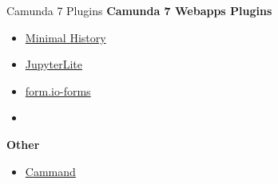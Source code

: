 \documentclass[12pt,aspectratio=169]{beamer}
\begin{document}
\begin{frame}{Camunda 7 Plugins}
\textbf{Camunda 7 Webapps Plugins}
\par
\vspace{0.5cm}
\par
\begin{minipage}{0.5\textwidth}
\begin{itemize}
    \item \href{https://github.com/datakurre/camunda-cockpit-plugins}{Minimal History}
    \item \href{https://github.com/datakurre/camunda-cockpit-plugin-jupyter}{JupyterLite}
    \item \href{https://github.com/StephenOTT/camunda-formio-plugin}{form.io-forms}
    \item[]
\end{itemize}
\textbf{Other}
\begin{itemize}
    \item \href{https://github.com/StephenOTT/Cammand}{Cammand}
\end{itemize}
\end{minipage}
\begin{minipage}{0.45\textwidth}
\end{minipage}
\end{frame}
\end{document}
